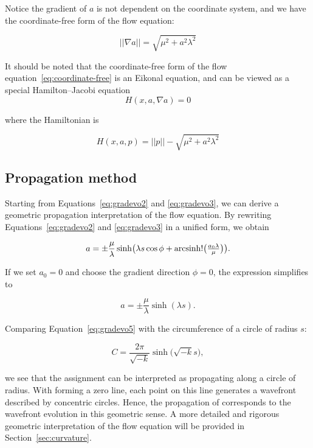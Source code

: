 Notice the gradient of \(a\) is not dependent on the coordinate system, and we have the coordinate-free form of the flow equation:

\begin{equation}\label{eq:coordinate-free}
||\nabla a|| = \sqrt{\mu^2 + a^2 \lambda^2}
\end{equation}

It should be noted that the coordinate-free form of the flow equation~\eqref{eq:coordinate-free} is an Eikonal equation,
and can be viewed as a special Hamilton–Jacobi equation
\[
H(x, a, \nabla a) = 0
\]

where the Hamiltonian is

\begin{equation}\label{eq:hamiltonian}
    H(x, a, p) = ||p|| - \sqrt{\mu^2 + a^2 \lambda^2}
\end{equation}

\subsection{Propagation method}\label{subsec:propagation-method}

Starting from Equations~\eqref{eq:gradevo2} and \eqref{eq:gradevo3}, we can derive a geometric propagation interpretation of the flow equation.
By rewriting Equations~\eqref{eq:gradevo2} and \eqref{eq:gradevo3} in a unified form, we obtain

\begin{equation}
a = \pm \frac{\mu}{\lambda} \sinh\bigl(\lambda s \cos \phi + \operatorname{arcsinh}!\bigl(\tfrac{a_0 \lambda}{\mu}\bigr)\bigr).\label{eq:gradevo4}
\end{equation}

If we set $a_0=0$ and choose the gradient direction $\phi=0$, the expression simplifies to

\begin{equation}
a = \pm \frac{\mu}{\lambda} \sinh(\lambda s).\label{eq:gradevo5}
\end{equation}

Comparing Equation~\eqref{eq:gradevo5} with the circumference of a circle of radius $s$:

\begin{equation}
C =  \frac{2\pi}{\sqrt{-k}} \sinh\bigl(\sqrt{-k} s\bigr), \label{eq:circle}
\end{equation}

we see that the assignment  can be interpreted as propagating along a circle of radius.
With  forming a zero line, each point on this line generates a wavefront described by concentric circles.
Hence, the propagation of  corresponds to the wavefront evolution in this geometric sense.
A more detailed and rigorous geometric interpretation of the flow equation will be provided in Section~\ref{sec:curvature}.

